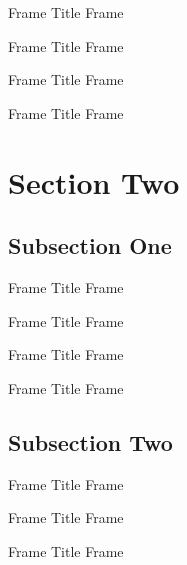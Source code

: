 \documentclass[14pt,xcolor={rgb}]{beamer}
\begin{document}
\begin{frame}{Frame Title}
Frame \insertframenumber
\end{frame}

\begin{frame}{Frame Title}
Frame \insertframenumber
\end{frame}

\begin{frame}{Frame Title}
Frame \insertframenumber
\end{frame}

\begin{frame}{Frame Title}
Frame \insertframenumber
\end{frame}

\section{Section Two}

\subsection{Subsection One}

\begin{frame}{Frame Title}
Frame \insertframenumber
\end{frame}

\begin{frame}{Frame Title}
Frame \insertframenumber
\end{frame}

\begin{frame}{Frame Title}
Frame \insertframenumber
\end{frame}

\begin{frame}{Frame Title}
Frame \insertframenumber
\end{frame}

\subsection{Subsection Two}

\begin{frame}{Frame Title}
Frame \insertframenumber
\end{frame}

\begin{frame}{Frame Title}
Frame \insertframenumber
\end{frame}

\begin{frame}{Frame Title}
Frame \insertframenumber
\end{frame}
\end{document}
